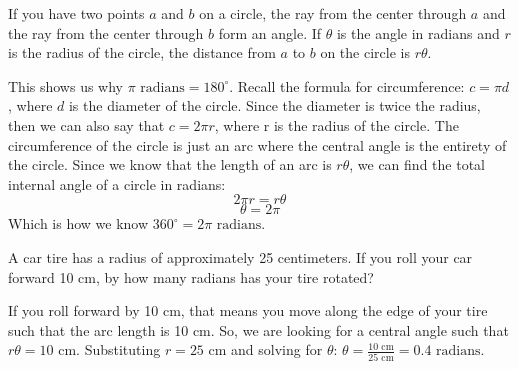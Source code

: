 \begin{mdframed}[style=important, frametitle={Length of an Arc}]

If you have two points $a$ and $b$ on a circle, the ray from the
center through $a$ and the ray from the center through $b$ form an
angle.  If $\theta$ is the angle in radians and $r$ is the radius of
the circle, the distance from $a$ to $b$ on the circle is $r \theta$.

\begin{center}
\end{center}


\end{mdframed}

This shows us why $\pi\text{ radians} = 180^\circ$. Recall the formula for 
circumference: $c = \pi d$, where $d$ is the diameter of the circle. Since the 
diameter is twice the radius, then we can also say that $c = 2\pi r$, where r 
is the radius of the circle. The circumference of the circle is just an arc 
where the central angle is the entirety of the circle. Since we know that the 
length of an arc is $r \theta$, we can find the total internal angle of a 
circle in radians:
$$2 \pi r = r \theta$$
$$\theta = 2\pi$$
Which is how we know $360^\circ = 2\pi\text{ radians}$. 

\begin{Exercise}[title = {Angle of Rotation}, label = radian1]
A car tire has a radius of approximately 25 centimeters. If you roll your car 
forward 10 cm, by how many radians has your tire rotated?
\end{Exercise}

\begin{Answer}[ref = radian1]
If you roll forward by 10 cm, that means you move along the edge of your tire 
such that the arc length is 10 cm. So, we are looking for a central angle such 
that $r \theta = 10 \text{ cm}$. Substituting $r = 25 \text{ cm}$ and solving 
for $\theta$: $\theta = \frac{10\text{ cm}}{25\text{ cm}} = 0.4\text{ radians}$. 
\end{Answer}

